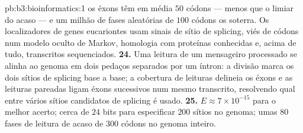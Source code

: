 \begin{solution}{pb:b3:bioinformatics:1}
os éxons têm em média $50$ códons --- menos que o limiar do acaso --- e
um milhão de fases aleatórias de $100$ códons os soterra. Os
localizadores de genes eucariontes usam sinais de sítio de splicing,
viés de códons num modelo oculto de Markov, homologia com proteínas
conhecidas e, acima de tudo, transcritos sequenciados.
\textbf{24.} Uma leitura de um mensageiro processado se alinha ao genoma
em dois pedaços separados por um íntron: a divisão marca os dois sítios
de splicing base a base; a cobertura de leituras delineia os éxons e as
leituras pareadas ligam éxons sucessivos num mesmo transcrito,
resolvendo qual entre vários sítios candidatos de splicing é usado.
\textbf{25.} $E \approx 7\times 10^{-15}$ para o melhor acerto; cerca de
$24$ bits para especificar $200$ sítios no genoma; umas $80$ fases de
leitura de acaso de $300$ códons no genoma inteiro.
\end{solution}
